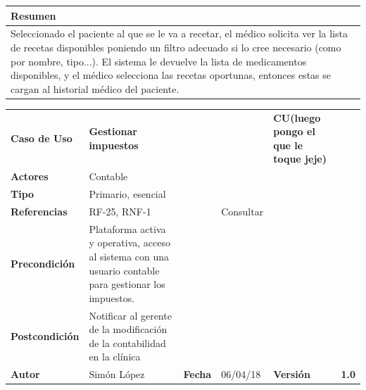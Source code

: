 \documentclass[11pt,a4paper]{article}
\begin{document}
\begin{table}[h]
	\centering
	\begin{tabular}{l}
		\hline
		\multicolumn{1}{|l|}{Resumen} \\ \hline
		Seleccionado el paciente al que se le va a recetar, el médico solicita ver la lista de recetas disponibles poniendo un filtro adecuado si lo cree necesario (como por nombre, tipo...). El sistema le devuelve la lista de medicamentos disponibles, y el médico selecciona las recetas oportunas, entonces estas se cargan al historial médico del paciente.
	\end{tabular}
\end{table}


\begin{table}[h]
	\centering
	\begin{tabular}{|l|lllll}
		\cline{1-1} \cline{6-6}
		\textbf{Caso de Uso}   & \textbf{Gestionar impuestos} &   &  & \multicolumn{1}{l|}{\textbf{\textbf{CU(luego pongo el que le toque jeje)}}}        & \multicolumn{1}{l|}{\textbf{}} \\ \cline{1-1} \cline{6-6} 
		\textbf{Actores}       & Contable &                                     &                       &                                       & \textbf{}                      \\ \cline{1-1}
		\textbf{Tipo}          & Primario, esencial  &                                     &                       &                                       & \textbf{}                      \\ \cline{1-1}
		\textbf{Referencias}   & RF-25, RNF-1                          &     & Consultar                       &                                       & \textbf{}                      \\ \cline{1-1}
		\textbf{Precondición}  & Plataforma activa y operativa, acceso al sistema con una usuario contable para gestionar los impuestos.       &                      &                & \textbf{}                      \\ \cline{1-1}
		\textbf{Postcondición} & Notificar al gerente de la modificación de la contabilidad en la clínica                &                      &                &                &               \\ \cline{1-1} \cline{3-3} \cline{5-5}
		\textbf{Autor}         & \multicolumn{1}{l|}{Simón López} & \multicolumn{1}{l|}{\textbf{Fecha}} & \multicolumn{1}{l|}{06/04/18} & \multicolumn{1}{l|}{\textbf{Versión}} & \textbf{1.0}                      \\ \cline{1-1} \cline{3-3} \cline{5-5}
	\end{tabular}
\end{table}
\end{document}

